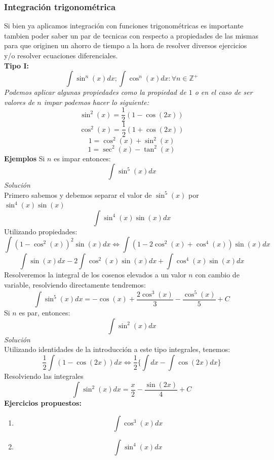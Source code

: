 \documentclass[10pt,executivepaper]{article}
\begin{document}
\subsubsection{Integración trigonométrica}
Si bien ya aplicamos integración con funciones trigonométricas es importante tambien poder saber un par de tecnicas con respecto a propiedades de las mismas para que originen un ahorro de tiempo a la hora de resolver diversos ejercicios y/o resolver ecuaciones diferenciales.\\
\textbf{Tipo I:}
\[\int\sin^{n}(x)dx;\int\cos^{n}(x)dx\colon\forall n\in\mathbb{Z^{+}}\]
\textit{Podemos aplicar algunas propiedades como la propiedad de $1$ o en el caso de ser valores de $n$ impar podemos hacer lo siguiente:}
\[\sin^{2}(x)=\frac{1}{2}(1-\cos(2x))\]
\[\cos^{2}(x)=\frac{1}{2}(1+\cos(2x))\]
\[1=\cos^{2}(x)+\sin^{2}(x)\]
\[1=\sec^{2}(x)-\tan^{2}(x)\]
\textbf{Ejemplos}
Si $n$ es impar entonces:
\[\int \sin^{5}(x)dx\]
\textit{Solución}
\\
Primero sabemos y debemos separar el valor de $\sin^{5}(x)$ por $\sin^{4}(x)\sin(x)$
\[\int\sin^{4}(x)\sin(x)dx\]
Utilizando propiedades:
\[\int(1-\cos^{2}(x))^{2}\sin(x)dx \Leftrightarrow \int(1-2\cos^{2}(x)+\cos^{4}(x))\sin(x)dx\]
\[\int\sin(x)dx - 2\int\cos^{2}(x)\sin(x)dx + \int\cos^{4}(x)\sin(x)dx\]
Resolveremos la integral de los cosenos elevados a un valor $n$ con cambio de variable, resolviendo directamente tendremos:
\[\int \sin^{5}(x)dx=-\cos(x)+\frac{2\cos^3(x)}{3}-\frac{\cos^{5}(x)}{5}+C\]
\vspace{0.75cm}
Si $n$ es par, entonces:
\[\int\sin^{2}(x)dx\]
\textit{Solución}\\
Utilizando identidades de la introducción a este tipo integrales, tenemos:
\[\frac{1}{2}\int(1-\cos(2x))dx \Leftrightarrow \frac{1}{2}\{\int dx - \int\cos(2x)dx\}\]
Resolviendo las integrales
\[\int\sin^{2}(x)dx=\frac{x}{2}-\frac{\sin(2x)}{4}+C\]
\clearpage
\textbf{Ejercicios propuestos:}
\begin{enumerate}
  \item \[\int\cos^{3}(x)dx\]
  \item \[\int\sin^{4}(x)dx\]
\end{enumerate}
\end{document}
